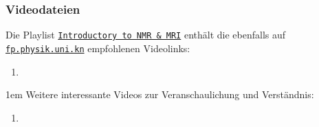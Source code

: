 \documentclass{subfiles}
\begin{document}
    \subsubsection*{Videodateien}
        Die Playlist \href{https://www.youtube.com/playlist?list=PLD14D78BC61685BD7}{\texttt{Introductory to NMR \& MRI}} enthält die ebenfalls auf \href{https://fp.physik.uni-konstanz.de}{\texttt{fp.physik.uni.kn}} empfohlenen Videolinks:
    \begin{enumerate}[label=(\alph*)]
        \item 
    \end{enumerate}

    \parskip1em
    Weitere interessante Videos zur Veranschaulichung und Verständnis:
    \begin{enumerate}[label=(\roman*)]
        \item 
    \end{enumerate}
\end{document}
